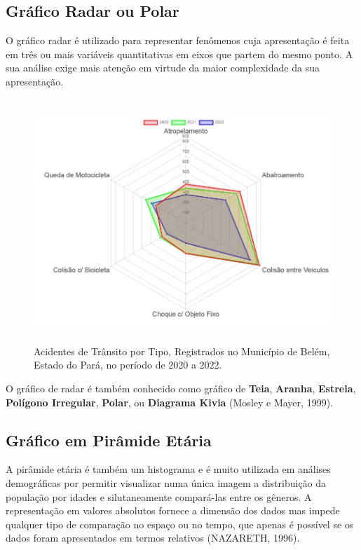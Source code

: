 \newpage
\subsection{Gráfico Radar ou Polar}

O gráfico radar é utilizado para representar fenômenos cuja
apresentação é feita em três ou mais variáveis quantitativas em eixos que partem do mesmo ponto. A sua análise exige mais
atenção em virtude da maior complexidade da sua apresentação. 



\begin{figure}[H]
    \centering
\includegraphics[scale=0.25,height=260pt,width=12cm]{figures/radarplot1.jpeg}
    \caption{Acidentes de Trânsito por Tipo, Registrados no Município de Belém, Estado do Pará, no período de 2020 a 2022.}
    \label{fig:my_label30}
\end{figure}


O gráfico de radar é também conhecido como gráfico de \textbf{Teia}, \textbf{Aranha}, \textbf{Estrela}, \textbf{Polígono Irregular}, \textbf{Polar}, ou \textbf{Diagrama Kivia} (Mosley e Mayer, 1999).


\newpage
\subsection{Gráfico em Pirâmide Etária}

A pirâmide etária é também um histograma e é muito utilizada em  análises demográficas por permitir visualizar numa única imagem a distribuição da população por idades e silutaneamente compará-las entre os gêneros. A representação em valores absolutos fornece a dimensão dos dados mas impede qualquer tipo de comparação no espaço ou no tempo, que apenas é possível se os dados foram apresentados em termos relativos (NAZARETH, 1996). 
\vskip0.3cm

